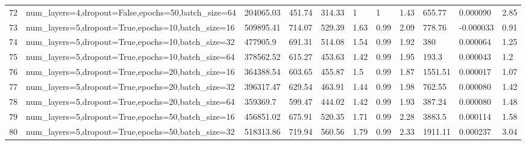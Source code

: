 \begin{longtable}{C{0.8cm} L{2cm} C{1.15cm} C{1.15cm} C{1.15cm} C{1.15cm} C{0.85cm} C{1.25cm} C{1.2cm} C{1.5cm} C{1.0cm}}
72 & num\_layers=4,\newline dropout=False,\newline epochs=50,\newline batch\_size=64 & 204065.03 & 451.74 & 314.33 & 1 & 1 & 1.43 & 655.77 & 0.000090 & 2.85 \\
73 & num\_layers=5,\newline dropout=True,\newline epochs=10,\newline batch\_size=16 & 509895.41 & 714.07 & 529.39 & 1.63 & 0.99 & 2.09 & 778.76 & -0.000033 & 0.91 \\
74 & num\_layers=5,\newline dropout=True,\newline epochs=10,\newline batch\_size=32 & 477905.9 & 691.31 & 514.08 & 1.54 & 0.99 & 1.92 & 380 & 0.000064 & 1.25 \\
75 & num\_layers=5,\newline dropout=True,\newline epochs=10,\newline batch\_size=64 & 378562.52 & 615.27 & 453.63 & 1.42 & 0.99 & 1.95 & 193.3 & 0.000043 & 1.2 \\
76 & num\_layers=5,\newline dropout=True,\newline epochs=20,\newline batch\_size=16 & 364388.54 & 603.65 & 455.87 & 1.5 & 0.99 & 1.87 & 1551.51 & 0.000017 & 1.07 \\
77 & num\_layers=5,\newline dropout=True,\newline epochs=20,\newline batch\_size=32 & 396317.47 & 629.54 & 463.91 & 1.44 & 0.99 & 1.98 & 762.55 & 0.000080 & 1.42 \\
78 & num\_layers=5,\newline dropout=True,\newline epochs=20,\newline batch\_size=64 & 359369.7 & 599.47 & 444.02 & 1.42 & 0.99 & 1.93 & 387.24 & 0.000080 & 1.48 \\
79 & num\_layers=5,\newline dropout=True,\newline epochs=50,\newline batch\_size=16 & 456851.02 & 675.91 & 520.35 & 1.71 & 0.99 & 2.28 & 3883.5 & 0.000114 & 1.58 \\
80 & num\_layers=5,\newline dropout=True,\newline epochs=50,\newline batch\_size=32 & 518313.86 & 719.94 & 560.56 & 1.79 & 0.99 & 2.33 & 1911.11 & 0.000237 & 3.04 \\

\end{longtable}
